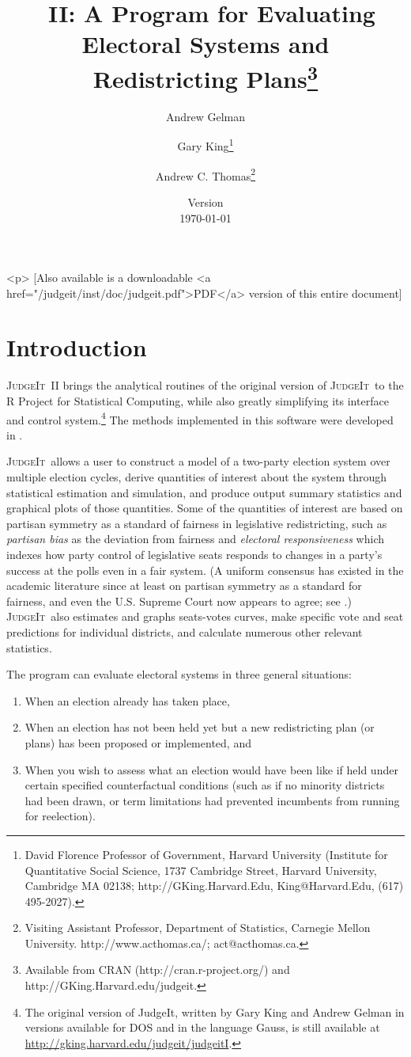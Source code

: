 \documentclass[oneside,letterpaper,titlepage]{article}
\title{\JudgeIt~II: A Program for Evaluating Electoral Systems and
  Redistricting Plans\thanks{Available from CRAN (http://cran.r-project.org/) and
    http://GKing.Harvard.edu/judgeit.}}
\author{Andrew Gelman \and Gary King\thanks{David Florence Professor
    of Government, Harvard University (Institute for Quantitative
    Social Science, 1737 Cambridge Street, Harvard University,
    Cambridge MA 02138; http://GKing.Harvard.Edu, King@Harvard.Edu,
    (617) 495-2027).}  \and %
	Andrew C. Thomas\thanks{Visiting Assistant Professor, Department of Statistics, Carnegie Mellon University. http://www.acthomas.ca/; act@acthomas.ca.}}
\date{Version \\ \today}
\newcommand{\JudgeIt}{\textsc{JudgeIt}\ }
\begin{document}
\maketitle

\begin{rawhtml}
  <p> [Also available is a downloadable <a
  href="/judgeit/inst/doc/judgeit.pdf">PDF</a> version of this entire document]
\end{rawhtml}

\tableofcontents
\clearpage

\section{Introduction}

\JudgeIt II brings the analytical routines of the original version of \JudgeIt to the R Project for Statistical Computing, while also greatly simplifying its interface and control system.\footnote{The original version of JudgeIt, written by Gary King and Andrew Gelman in   versions available for DOS and in the language Gauss, is still available at \url{http://gking.harvard.edu/judgeit/judgeitI}.}  The methods implemented in this software were developed in \citet{GelKin90,GelKin90b,GelKin94a,GelKin94b,KinGel91,GelKatKin04}.

\JudgeIt allows a user to construct a model of a two-party election system over multiple election cycles, derive quantities of interest about the system through statistical estimation and simulation, and produce output summary statistics and graphical plots of those quantities.  Some of the quantities of interest are based on partisan symmetry as a standard of fairness in legislative redistricting, such as \emph{partisan bias} as the deviation from fairness and \emph{electoral responsiveness} which indexes how party control of legislative seats responds to changes in a party's success at the polls even in a fair system.  (A uniform consensus has existed in the academic literature since at least \citet{KinBro87} on partisan symmetry as a standard for fairness, and even the U.S. Supreme Court now appears to agree; see \citealt{GroKin07}.)  \JudgeIt also estimates and graphs seats-votes curves, make specific vote and seat predictions for individual districts, and calculate numerous other relevant statistics.

The program can evaluate electoral systems in three general situations:
\begin{enumerate}
\item When an election already has taken place,
\item When an election has not been held yet but a new redistricting plan (or plans) has been proposed or implemented, and
\item When you wish to assess what an election would have been like if held under certain specified counterfactual conditions (such as if no minority districts had been drawn, or term limitations had prevented incumbents from running for reelection).
\end{enumerate}
\end{document}
